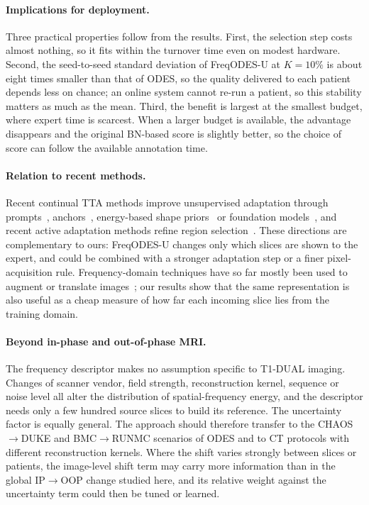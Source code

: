 \documentclass[a4paper,fleqn]{cas-dc}
\begin{document}
\paragraph{Implications for deployment.} Three practical properties follow from the results. First, the selection step costs almost nothing, so it fits within the turnover time even on modest hardware. Second, the seed-to-seed standard deviation of FreqODES-U at $K=10\%$ is about eight times smaller than that of ODES, so the quality delivered to each patient depends less on chance; an online system cannot re-run a patient, so this stability matters as much as the mean. Third, the benefit is largest at the smallest budget, where expert time is scarcest. When a larger budget is available, the advantage disappears and the original BN-based score is slightly better, so the choice of score can follow the available annotation time.

\paragraph{Relation to recent methods.} Recent continual TTA methods improve unsupervised adaptation through prompts~\cite{chen2024vptta,li2025mgipt,du2026spegc}, anchors~\cite{wu2026a3tta}, energy-based shape priors~\cite{zhang2025energy} or foundation models~\cite{ji2026redifm,wu2025samtta}, and recent active adaptation methods refine region selection~\cite{gao2024superpixel,huynh2026category,yan2026tcada}. These directions are complementary to ours: FreqODES-U changes only which slices are shown to the expert, and could be combined with a stronger adaptation step or a finer pixel-acquisition rule. Frequency-domain techniques have so far mostly been used to augment or translate images~\cite{zhao2024morestyle,wu2025randdg,yin2025ddfp}; our results show that the same representation is also useful as a cheap measure of how far each incoming slice lies from the training domain.

\paragraph{Beyond in-phase and out-of-phase MRI.} The frequency descriptor makes no assumption specific to T1-DUAL imaging. Changes of scanner vendor, field strength, reconstruction kernel, sequence or noise level all alter the distribution of spatial-frequency energy, and the descriptor needs only a few hundred source slices to build its reference. The uncertainty factor is equally general. The approach should therefore transfer to the CHAOS$\rightarrow$DUKE and BMC$\rightarrow$RUNMC scenarios of ODES and to CT protocols with different reconstruction kernels. Where the shift varies strongly between slices or patients, the image-level shift term may carry more information than in the global IP$\rightarrow$OOP change studied here, and its relative weight against the uncertainty term could then be tuned or learned.
\end{document}
